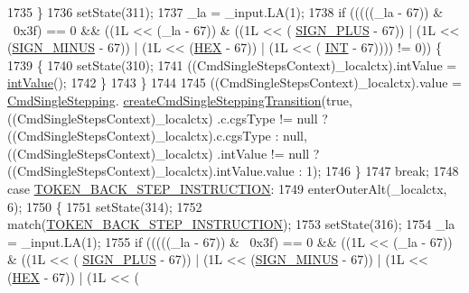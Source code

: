 \begin{DoxyCode}
1735         \}
1736         setState(311);
1737         \_la = \_input.LA(1);
1738         \textcolor{keywordflow}{if} (((((\_la - 67)) & ~0x3f) == 0 && ((1L << (\_la - 67)) & ((1L << (
      \hyperlink{classgov_1_1nasa_1_1jpf_1_1inspector_1_1client_1_1parser_1_1_console_grammar_parser_ac2a6ae73b3b6ce7feef07c1b4866af05}{SIGN\_PLUS} - 67)) | (1L << (\hyperlink{classgov_1_1nasa_1_1jpf_1_1inspector_1_1client_1_1parser_1_1_console_grammar_parser_a48b3f6921fee5d663dafe240074dac66}{SIGN\_MINUS} - 67)) | (1L << (\hyperlink{classgov_1_1nasa_1_1jpf_1_1inspector_1_1client_1_1parser_1_1_console_grammar_parser_a760e1cd3b643e8ee8af5d134b5d438c6}{HEX} - 67)) | (1L << (
      \hyperlink{classgov_1_1nasa_1_1jpf_1_1inspector_1_1client_1_1parser_1_1_console_grammar_parser_abd77a1befc3eca91ef4ffb5856126df5}{INT} - 67)))) != 0)) \{
1739           \{
1740           setState(310);
1741           ((CmdSingleStepsContext)\_localctx).intValue = \hyperlink{classgov_1_1nasa_1_1jpf_1_1inspector_1_1client_1_1parser_1_1_console_grammar_parser_a132b5d5236398d90d8d1e6b16dc0bd20}{intValue}();
1742           \}
1743         \}
1744 
1745          ((CmdSingleStepsContext)\_localctx).value =  \hyperlink{classgov_1_1nasa_1_1jpf_1_1inspector_1_1client_1_1commands_1_1_cmd_single_stepping}{CmdSingleStepping}.
      \hyperlink{classgov_1_1nasa_1_1jpf_1_1inspector_1_1client_1_1commands_1_1_cmd_single_stepping_a7d487203117503a88884efc6592e5b39}{createCmdSingleSteppingTransition}(\textcolor{keyword}{true}, ((CmdSingleStepsContext)\_localctx)
      .c.cgsType != null ? ((CmdSingleStepsContext)\_localctx).c.cgsType : null, ((CmdSingleStepsContext)\_localctx)
      .intValue != null ? ((CmdSingleStepsContext)\_localctx).intValue.value : 1); 
1746         \}
1747         \textcolor{keywordflow}{break};
1748       \textcolor{keywordflow}{case} \hyperlink{classgov_1_1nasa_1_1jpf_1_1inspector_1_1client_1_1parser_1_1_console_grammar_parser_ab99720d771726d59ac9362053e31a6f1}{TOKEN\_BACK\_STEP\_INSTRUCTION}:
1749         enterOuterAlt(\_localctx, 6);
1750         \{
1751         setState(314);
1752         match(\hyperlink{classgov_1_1nasa_1_1jpf_1_1inspector_1_1client_1_1parser_1_1_console_grammar_parser_ab99720d771726d59ac9362053e31a6f1}{TOKEN\_BACK\_STEP\_INSTRUCTION});
1753         setState(316);
1754         \_la = \_input.LA(1);
1755         \textcolor{keywordflow}{if} (((((\_la - 67)) & ~0x3f) == 0 && ((1L << (\_la - 67)) & ((1L << (
      \hyperlink{classgov_1_1nasa_1_1jpf_1_1inspector_1_1client_1_1parser_1_1_console_grammar_parser_ac2a6ae73b3b6ce7feef07c1b4866af05}{SIGN\_PLUS} - 67)) | (1L << (\hyperlink{classgov_1_1nasa_1_1jpf_1_1inspector_1_1client_1_1parser_1_1_console_grammar_parser_a48b3f6921fee5d663dafe240074dac66}{SIGN\_MINUS} - 67)) | (1L << (\hyperlink{classgov_1_1nasa_1_1jpf_1_1inspector_1_1client_1_1parser_1_1_console_grammar_parser_a760e1cd3b643e8ee8af5d134b5d438c6}{HEX} - 67)) | (1L << (

\end{DoxyCode}
